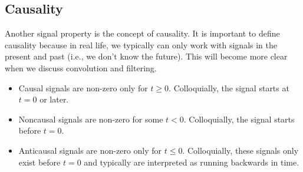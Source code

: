 \documentclass[10pt]{article}
\begin{document}
\subsection*{Causality}
Another signal property is the concept of causality.  It is important to define causality because in real life, we typically can only work with signals in the present and past (i.e., we don't know the future).  This will become more clear when we discuss convolution and filtering.
\begin{itemize}
    \item Causal signals are non-zero only for $t \geq 0$.  Colloquially, the signal starts at $t = 0$ or later.
    \item Noncausal signals are non-zero for some $t < 0$.  Colloquially, the signal starts before $t = 0$.
    \item Anticausal signals are non-zero only for $t \leq 0$.  Colloquially, these signals only exist before $t = 0$ and typically are interpreted as running backwards in time.
\end{itemize}
\end{document}
